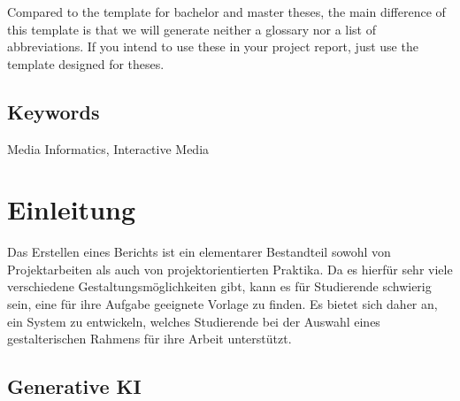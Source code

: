 \documentclass[12pt,        %
  english,ngerman,          %
  paper=a4,                 %
  captions=tablesignature,  %
  listof=numbered,          %
  bibliography=totoc,       %
  headings=small,           %
  headinclude=false,        %
  footinclude=false,        %
  parskip=half-,            %
  oneside,                  %
  BCOR=5mm,                 %
  DIV=12                    %
  ]{scrbook}                %
\begin{document}
  Compared to the template for bachelor and master theses, the main difference 
  of this template is that we will generate neither a glossary nor a list of
  abbreviations. If you intend to use these in your project report, just
  use the template designed for theses.

\vfill

\section*{Keywords} Media Informatics, Interactive Media

\clearpage
\setcounter{tocdepth}{1}
\tableofcontents

\mainmatter

\chapter{Einleitung}\label{chapter:introduction}


Das Erstellen eines Berichts ist ein elementarer Bestandteil sowohl von Projektarbeiten als auch von projektorientierten Praktika. Da es hierfür sehr viele verschiedene  Gestaltungsmöglichkeiten gibt, kann es für Studierende schwierig sein, eine für ihre Aufgabe geeignete Vorlage zu finden. Es bietet sich daher  an, ein System zu entwickeln, welches Studierende bei der Auswahl eines  gestalterischen Rahmens für ihre Arbeit unterstützt.

\section{Generative KI}

  
\end{document}
